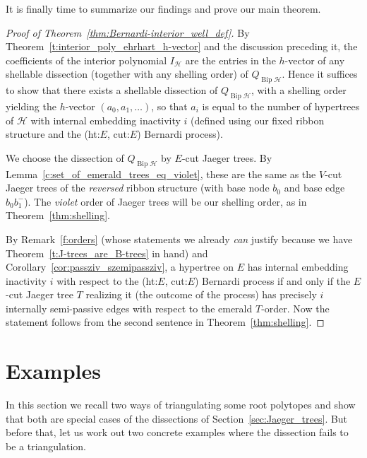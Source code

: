 \documentclass[10pt]{amsart}
\theoremstyle{definition}\newtheorem{defi}[theo]{Definition}
\theoremstyle{remark}\newtheorem{rema}[theo]{Remark}
\newcommand{\HH}{\mathcal H}
\DeclareMathOperator{\bip}{Bip}
\begin{document}
It is finally time to summarize our findings and prove our main theorem.

\begin{proof}[Proof of Theorem~\ref{thm:Bernardi-interior_well_def}]
By Theorem~\ref{t:interior_poly_ehrhart_h-vector} and the discussion preceding it, the coefficients of the interior polynomial $I_\HH$ are the entries in the $h$-vector of any shellable dissection (together with any shelling order) of $Q_{\bip \HH}$. Hence it suffices to show that there exists a shellable dissection of $Q_{\bip \HH}$, with a shelling order yielding the $h$-vector $(a_0,a_1,\dots )$, so that $a_i$ is equal to the number of hypertrees of $\HH$ with internal embedding inactivity $i$ (defined using our fixed ribbon structure and the (ht:$E$, cut:$E$) Bernardi process).

We choose the dissection of $Q_{\bip \HH}$ by $E$-cut Jaeger trees. By Lemma~\ref{c:set_of_emerald_trees_eq_violet}, these are the same as the $V$-cut Jaeger trees of the \emph{reversed} ribbon structure (with base node $b_0$ and base edge $b_0b_1^-$). The \emph{violet} order of Jaeger trees will be our shelling order, as in Theorem~\ref{thm:shelling}.

By Remark~\ref{f:orders} (whose statements we already \emph{can} justify because we have Theorem~\ref{t:J-trees_are_B-trees} in hand) and Corollary~\ref{cor:passziv_szemipassziv}, a hypertree on $E$ has internal embedding inactivity $i$ with respect to the (ht:$E$, cut:$E$) Bernardi process if and only if the $E$-cut Jaeger tree $T$ realizing it (\ie the outcome of the process) has precisely $i$ internally semi-passive edges with respect to the emerald $T$-order. Now the statement follows from the second sentence in Theorem~\ref{thm:shelling}.
\end{proof}



\section{Examples}
\label{sec:examples}

In this section we recall two ways of triangulating some root polytopes and show that both are special cases of the dissections of Section~\ref{sec:Jaeger_trees}. But before that, let us work out two concrete examples where the dissection fails to be a triangulation.
\end{document}
